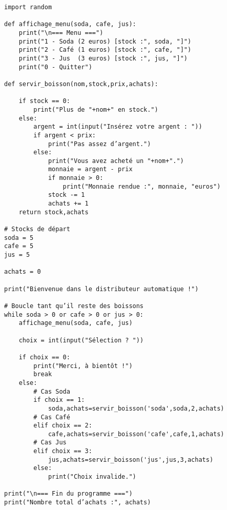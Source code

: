 \reponse{}

\begin{verbatim}
import random

def affichage_menu(soda, cafe, jus):
    print("\n=== Menu ===")
    print("1 - Soda (2 euros) [stock :", soda, "]")
    print("2 - Café (1 euros) [stock :", cafe, "]")
    print("3 - Jus  (3 euros) [stock :", jus, "]")
    print("0 - Quitter")

def servir_boisson(nom,stock,prix,achats):

    if stock == 0:
        print("Plus de "+nom+" en stock.")
    else:
        argent = int(input("Insérez votre argent : "))
        if argent < prix:
            print("Pas assez d’argent.")
        else:
            print("Vous avez acheté un "+nom+".")
            monnaie = argent - prix
            if monnaie > 0:
                print("Monnaie rendue :", monnaie, "euros")
            stock -= 1
            achats += 1
    return stock,achats

# Stocks de départ
soda = 5
cafe = 5
jus = 5

achats = 0

print("Bienvenue dans le distributeur automatique !")

# Boucle tant qu’il reste des boissons
while soda > 0 or cafe > 0 or jus > 0:
    affichage_menu(soda, cafe, jus)
    
    choix = int(input("Sélection ? "))

    if choix == 0:
        print("Merci, à bientôt !")
        break
    else:
        # Cas Soda
        if choix == 1:
            soda,achats=servir_boisson('soda',soda,2,achats)
        # Cas Café
        elif choix == 2:
            cafe,achats=servir_boisson('cafe',cafe,1,achats)
        # Cas Jus
        elif choix == 3:
            jus,achats=servir_boisson('jus',jus,3,achats)
        else:
            print("Choix invalide.")

print("\n=== Fin du programme ===")
print("Nombre total d’achats :", achats)
\end{verbatim}

\reponse{}

